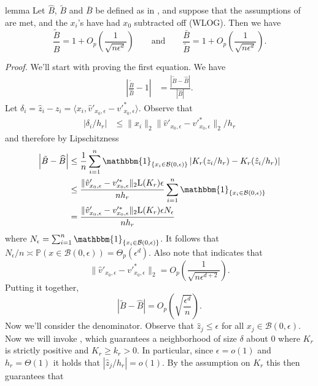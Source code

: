 \documentclass[11pt]{article}
\begin{document}
\begin{appendices}
\begin{restatable}{lemma}{} \label{lemma: regression ratios}
    Let $\widehat{B}$, $\tilde{B}$ and $\bar{B}$ be defined as in , and suppose that the assumptions of  are met, and the $x_i$'s have had $x_0$ subtracted off (WLOG). Then we have
    \begin{equation}
        \frac{\tilde{B}}{\widehat{B}} =  1 +  O_p\left(\frac{1}{\sqrt{n\epsilon^d}}\right) \qquad \text{and} \qquad 
        \frac{\bar{B}}{\tilde{B}} = 1 + O_p\left(\frac{1}{\sqrt{n\epsilon^d}}\right).
    \end{equation}
\end{restatable}
\noindent \textit{Proof.} We'll start with proving the first equation. We have
\begin{align*}
    \left|\frac{\tilde{B}}{\widehat{B}} - 1\right| &= \frac{\left|\tilde{B} - \widehat{B}\right|}{\left|\widehat{B}\right|}.
\end{align*}
Let $\delta_i = \hat{z}_i - z_i = \langle x_i , \hat{v}'_{x_0, \epsilon} - v'^*_{x_0, \epsilon} \rangle$. Observe that
\begin{align*}
    \left|\delta_i/h_r\right| &\leq \|x_i\|_2\|\hat{v}'_{x_0, \epsilon} - v'^*_{x_0, \epsilon}\|_2/h_r
\end{align*}
and therefore by Lipschitzness
\begin{align}
    \left|\tilde{B} - \widehat{B}\right| &\leq \frac{1}{n}\sum_{i = 1}^{n}\mathbbm{1}_{\{x_i \in \mathcal{B}(0, \epsilon)\}}\left|K_r(z_i/h_r) - K_r(\hat{z}_i/h_r)\right| \\
    &\leq \frac{\|\hat{v}'_{x_0, \epsilon} - v'^*_{x_0, \epsilon}\|_2\text{L}(K_r)\epsilon}{nh_r}\sum_{i = 1}^{n}\mathbbm{1}_{\{x_i \in \mathcal{B}(0, \epsilon)\}} \\
    &= \frac{\|\hat{v}'_{x_0, \epsilon} - v'^*_{x_0, \epsilon}\|_2\text{L}(K_r)\epsilon N_{\epsilon}}{nh_r}
\end{align}
where $N_\epsilon = \sum_{i = 1}^{n}\mathbbm{1}_{\{x_i \in \mathcal{B}(0, \epsilon)\}}$. It follows that $N_{\epsilon}/n \asymp \mathbb{P}(x \in \mathcal{B}(0,\epsilon)) = \Theta_p(\epsilon^d)$. Also note that  indicates that 
\[\|\hat{v}'_{x_0, \epsilon} - v'^*_{x_0, \epsilon}\|_2 = O_p\left(\frac{1}{\sqrt{n\epsilon^{d+2}}}\right).\]
Putting it together,
\[\left|\tilde{B} - \widehat{B}\right| = O_p\left(\sqrt{\frac{\epsilon^d}{n}}\right).\]
Now we'll consider the denominator. Observe that $\hat{z}_j \leq \epsilon$ for all $x_j \in \mathcal{B}(0, \epsilon)$. Now we will invoke , which guarantees a neighborhood of size $\delta$ about $0$ where $K_r$ is strictly positive and $K_r \geq k_r > 0$. In particular, since $\epsilon = o(1)$ and $h_r = \Theta(1)$ it holds that $|\hat{z}_j/h_r| = o(1)$. By the assumption on $K_r$ this then guarantees that

\end{appendices}
\end{document}
